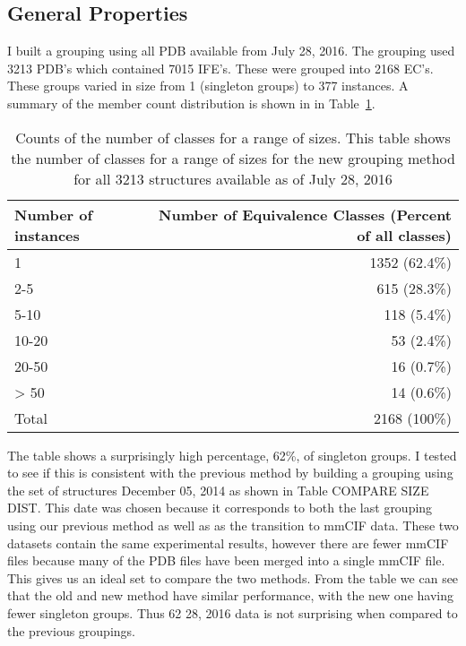 \subsection{General Properties}

I built a grouping using all PDB available from July 28, 2016. The grouping used
3213 PDB’s which contained 7015 IFE’s. These were grouped into 2168 EC’s. These
groups varied in size from 1 (singleton groups) to 377 instances. A summary of
the member count distribution is shown in in Table~\ref{tab:eq-size-dist}.

\begin{table}
  \begin{tabular}{lr}
    \toprule
    Number of instances & Number of Equivalence Classes (Percent of all classes) \\
    \midrule
    1 & 1352 (62.4\%) \\
    2-5 & 615 (28.3\%) \\
    5-10 & 118 (5.4\%) \\
    10-20 & 53 (2.4\%) \\
    20-50 & 16 (0.7\%) \\
    > 50 & 14 (0.6\%)\\
    Total & 2168 (100\%) \\
    \bottomrule
  \end{tabular}
  \caption{Counts of the number of classes for a range of sizes. This table
    shows the number of classes for a range of sizes for the new grouping method
  for all 3213 structures available as of July 28, 2016}
  \label{tab:eq-size-dist}
\end{table}

The table shows a surprisingly high percentage, 62\%, of singleton groups. I
tested to see if this is consistent with the previous method by building a
grouping using the set of structures December 05, 2014 as shown in Table COMPARE
SIZE DIST. This date was chosen because it corresponds to both the last grouping
using our previous method as well as as the transition to mmCIF data. These two
datasets contain the same experimental results, however there are fewer mmCIF
files because many  of the PDB files have been merged into a single mmCIF file.
This gives us an ideal set to compare the two methods. From the table we can see
that the old and new method have similar performance, with the new one having
fewer singleton groups. Thus 62%
28, 2016 data is not surprising when compared to the previous groupings. 


